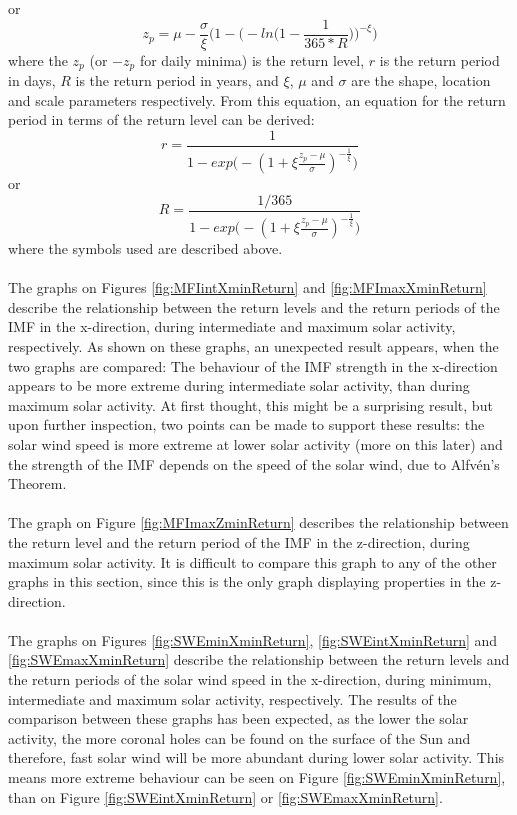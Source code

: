 \documentclass[12pt]{article}
\begin{document}
        or
        \begin{equation}
            z_p = \mu-\frac{\sigma}{\xi}\Bigg( 1-\Bigg( -ln\Bigg( 1-\frac{1}{365*R}\Bigg) \Bigg) ^{-\xi}\Bigg)
        \end{equation}
        where the $z_p$ (or $-z_p$ for daily minima) is the return level, $r$ is the return period in days, $R$ is the return period in years, and $\xi$, $\mu$ and $\sigma$ are the shape, location and scale parameters respectively. From this equation, an equation for the return period in terms of the return level can be derived:
        \begin{equation}
            r=\frac{1}{1-exp\Bigg( -(1+\xi \frac{z_p-\mu}{\sigma})^{-\frac{1}{\xi}}\Bigg) }
        \end{equation}
        or
        \begin{equation}
            R=\frac{1/365}{1-exp\Bigg( -(1+\xi \frac{z_p-\mu}{\sigma})^{-\frac{1}{\xi}}\Bigg) }
        \end{equation}
        where the symbols used are described above.\\ \\
        The graphs on Figures \ref{fig:MFIintXminReturn} and \ref{fig:MFImaxXminReturn} describe the relationship between the return levels and the return periods of the IMF in the x-direction, during intermediate and maximum solar activity, respectively. As shown on these graphs, an unexpected result appears, when the two graphs are compared: The behaviour of the IMF strength in the x-direction appears to be more extreme during intermediate solar activity, than during maximum solar activity. At first thought, this might be a surprising result, but upon further inspection, two points can be made to support these results: the solar wind speed is more extreme at lower solar activity (more on this later) and the strength of the IMF depends on the speed of the solar wind, due to Alfvén's Theorem\cite{1976alfven}.\\ \\
        The graph on Figure \ref{fig:MFImaxZminReturn} describes the relationship between the return level and the return period of the IMF in the z-direction, during maximum solar activity. It is difficult to compare this graph to any of the other graphs in this section, since this is the only graph displaying properties in the z-direction.\\ \\
        The graphs on Figures \ref{fig:SWEminXminReturn}, \ref{fig:SWEintXminReturn} and \ref{fig:SWEmaxXminReturn} describe the relationship between the return levels and the return periods of the solar wind speed in the x-direction, during minimum, intermediate and maximum solar activity, respectively. The results of the comparison between these graphs has been expected, as the lower the solar activity, the more coronal holes can be found on the surface of the Sun and therefore, fast solar wind will be more abundant during lower solar activity. This means more extreme behaviour can be seen on Figure \ref{fig:SWEminXminReturn}, than on Figure \ref{fig:SWEintXminReturn} or \ref{fig:SWEmaxXminReturn}.\\
\end{document}
